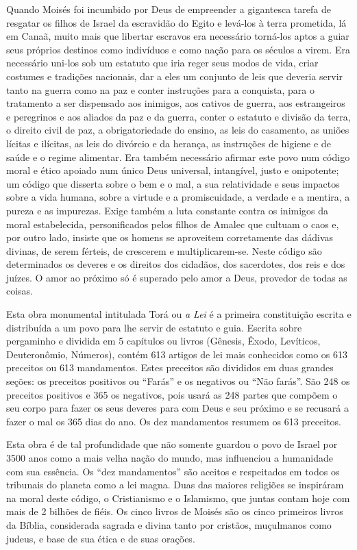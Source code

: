 Quando Moisés foi incumbido por Deus de empreender a gigantesca tarefa
de resgatar os filhos de Israel da escravidão do Egito e levá-los à
terra prometida, lá em Canaã, muito mais que libertar escravos era
necessário torná-los aptos a guiar seus próprios destinos como
indivíduos e como nação para os séculos a virem. Era necessário uni-los
sob um estatuto que iria reger seus modos de vida, criar costumes e
tradições nacionais, dar a eles um conjunto de leis que deveria servir
tanto na guerra como na paz e conter instruções para a conquista, para o
tratamento a ser dispensado aos inimigos, aos cativos de guerra, aos
estrangeiros e peregrinos e aos aliados da paz e da guerra, conter o
estatuto e divisão da terra, o direito civil de paz, a obrigatoriedade
do ensino, as leis do casamento, as uniões lícitas e ilícitas, as leis
do divórcio e da herança, as instruções de higiene e de saúde e o regime
alimentar. Era também necessário afirmar este povo num código moral e
ético apoiado num único Deus universal, intangível, justo e onipotente;
um código que disserta sobre o bem e o mal, a sua relatividade e seus
impactos sobre a vida humana, sobre a virtude e a promiscuidade, a
verdade e a mentira, a pureza e as impurezas. Exige também a luta
constante contra os inimigos da moral estabelecida, personificados
pelos filhos de Amalec que cultuam o caos e, por outro lado, insiste que
os homens se aproveitem corretamente das dádivas divinas, de serem
férteis, de crescerem e multiplicarem-se. Neste código são determinados
os deveres e os direitos dos cidadãos, dos sacerdotes, dos reis e dos
juízes. O amor ao próximo só é superado pelo amor a Deus, provedor de
todas as coisas.

Esta obra monumental intitulada Torá ou \emph{a Lei} é a
primeira constituição escrita e distribuída a um povo para lhe servir
de estatuto e guia. Escrita sobre pergaminho e dividida em 5 capítulos
ou livros (Gênesis, Êxodo, Levíticos, Deuteronômio, Números), contém 613
artigos de lei mais conhecidos como os 613 preceitos ou 613 mandamentos.
Estes preceitos são divididos em duas grandes seções: os preceitos
positivos ou ``Farás'' e os negativos ou ``Não farás''. São 248 os
preceitos positivos e 365 os negativos, pois usará as 248 partes que
compõem o seu corpo para fazer os seus deveres para com Deus e seu
próximo e se recusará a fazer o mal os 365 dias do ano. Os dez
mandamentos resumem os 613 preceitos.

Esta obra é de tal profundidade que não somente guardou o povo de Israel
por 3500 anos como a mais velha nação do mundo, mas influenciou a
humanidade com sua essência. Os ``dez mandamentos'' são aceitos e
respeitados em todos os tribunais do planeta como a lei magna. Duas das
maiores religiões se inspiráram na moral deste código, o Cristianismo e
o Islamismo, que juntas contam hoje com mais de 2 bilhões de fiéis. Os
cinco livros de Moisés são os cinco primeiros livros da Bíblia,
considerada sagrada e divina tanto por cristãos, muçulmanos como judeus,
e base de sua ética e de suas orações.

